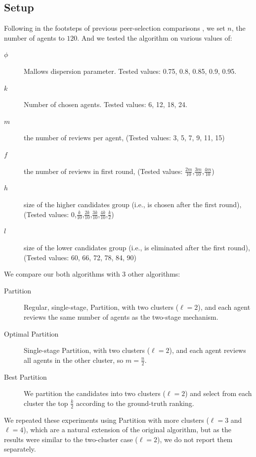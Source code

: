 \documentclass[letterpaper]{article} %
\begin{document}
\subsection{Setup}
Following in the footsteps of previous peer-selection comparisons \cite{ALMRW19,LMTZ23}, we set $n$, the number of agents to $120$. And we tested the algorithm on various values of:
\begin{description}
\item [$\phi$] Mallows dispersion parameter. Tested values: 0.75, 0.8, 0.85, 0.9, 0.95.
\item [$k$] Number of chosen agents. Tested values: 6, 12, 18, 24.
\item [$m$] the number of reviews per agent, (Tested values: 3, 5, 7, 9, 11, 15)
\item [$f$] the number of reviews in first round, (Tested values: $\frac{2m}{10}$,$\frac{3m}{10}$,$\frac{4m}{10}$)
\item [$h$] size of the higher candidates group (i.e., is chosen after the first round), (Tested values: $0$,$\frac{k}{10}$,$\frac{2k}{10}$,$\frac{3k}{10}$,$\frac{4k}{10}$,$\frac{k}{2}$)
\item [$l$] size of the lower candidates group (i.e., is eliminated after the first round), (Tested values: 60, 66, 72, 78, 84, 90)
\end{description}
We compare our both algorithms with 3 other algorithms:
\begin{description}
\item [Partition] Regular, single-stage, Partition, with two clusters ($\ell=2$), and each agent reviews the same number of agents as the two-stage mechanism.
\item [Optimal Partition] Single-stage Partition, with two clusters ($\ell=2$), and each agent reviews all agents in the other cluster, so $m=\frac{n}{2}$.
\item [Best Partition] We partition the candidates into two clusters ($\ell=2$) and select from each cluster the top $\frac{k}{2}$ according to the ground-truth ranking.
\end{description}

We repeated these experiments using Partition with more clusters ($\ell=3$ and $\ell=4$), which are a natural extension of the original \citet{AFPT11} algorithm, but as the results were similar to the two-cluster case ($\ell=2$), we do not report them separately.
\end{document}
